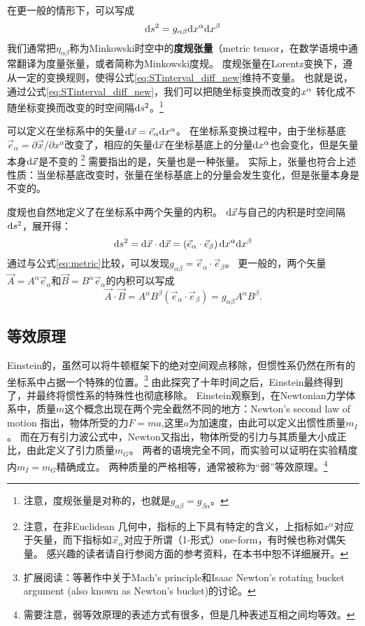 在更一般的情形下，可以写成
\begin{equation}\label{eq:metric}
  {\rm d}s^2 = g_{\alpha \beta}{\rm d}x^\alpha {\rm d} x^\beta
\end{equation}
我们通常把$\eta_ {\alpha \beta}$称为Minkowski时空中的{\textbf{度规张量}}（metric tensor，在数学语境中通常翻译为度量张量，或者简称为Minkowski度规。
度规张量在Lorentz变换下，遵从一定的变换规则，使得公式\ref{eq:STinterval_diff_new}维持不变量。
也就是说，通过公式\ref{eq:STinterval_diff_new}，我们可以把随坐标变换而改变的${\rm }x^{\alpha} $ 转化成不随坐标变换而改变的时空间隔${\rm d} s^2$。\footnote{注意，度规张量是对称的，也就是$g_{\alpha\beta}=g_{\beta\alpha}$。}

可以定义在坐标系中的矢量${\rm d}\vec{x} = \vec{e}_\alpha {\rm d}x^\alpha$。
在坐标系变换过程中，由于坐标基底$\vec{e}_\alpha = \partial \vec{x}/ \partial x^\alpha$改变了，相应的矢量${\rm d}\vec{x} $在坐标基底上的分量${\rm d}x^\alpha$也会变化，但是矢量本身${\rm d}\vec{x} $是不变的
\footnote{注意，在非Euclidean 几何中，指标的上下具有特定的含义，上指标如$x^\alpha$对应于矢量，而下指标如$\vec{x}_\alpha$对应于所谓（1-形式）one-form，有时候也称对偶矢量。
感兴趣的读者请自行参阅\GR 方面的参考资料，在本书中恕不详细展开。}
需要指出的是，矢量也是一种张量。
实际上，张量也符合上述性质：当坐标基底改变时，张量在坐标基底上的分量会发生变化，但是张量本身是不变的。

度规也自然地定义了在坐标系中两个矢量的内积。
${\rm d}\vec{x}$与自己的内积是时空间隔${\rm d}s^2$，展开得：
\begin{equation}\label{eq:InnerProduct1}
  {\rm d}s^2 =  {\rm d}\vec{x}\cdot{\rm d}\vec{x} = \left(\vec{e}_\alpha \cdot \vec{e}_\beta \right) {\rm d}x^\alpha {\rm d}x^\beta
\end{equation}
通过与公式\ref{eq:metric}比较，可以发现$g_{\alpha\beta} = \vec{e}_\alpha \cdot \vec{e}_\beta$。
更一般的，两个矢量$\vec{A} = A^\alpha \vec{e}_\alpha$和$\vec{B} = B^\alpha \vec{e}_\alpha$的内积可以写成
\begin{equation}\label{eq:InnerProduct2}
  \vec{A}\cdot\vec{B}= A^\alpha B^\beta \left(\vec{e}_\alpha \cdot \vec{e}_\beta \right) =  g_{\alpha \beta}A^\alpha B^\beta.
\end{equation}

\subsection{等效原理}
Einstein的\SR，虽然可以将牛顿框架下的绝对空间观点移除，但惯性系仍然在所有的坐标系中占据一个特殊的位置。\footnote{扩展阅读：\cite{Rindler:GR}等著作中关于Mach's principle和Isaac Newton's rotating bucket argument (also known as Newton's bucket)的讨论。}
由此探究了十年时间之后，Einstein最终得到了\GR ，并最终将惯性系的特殊性也彻底移除。
Einstein观察到，在Newtonian力学体系中，质量$m$这个概念出现在两个完全截然不同的地方：Newton's second law of motion 指出，物体所受的力$F=ma$,这里$a$为加速度，由此可以定义出惯性质量$m_I$。
而在万有引力波公式中，Newton又指出，物体所受的引力与其质量大小成正比，由此定义了引力质量$m_G$。
两者的语境完全不同，而实验可以证明在实验精度内$m_I = m_G$精确成立。
两种质量的严格相等，通常被称为“弱”等效原理。\footnote{需要注意，弱等效原理的表述方式有很多，但是几种表述互相之间均等效。}

